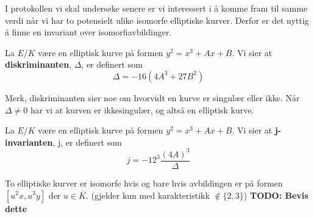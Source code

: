 
I protokollen vi skal undersøke senere er vi interessert i å komme fram til samme verdi når vi har to potensielt ulike isomorfe elliptiske kurver. Derfor er det nyttig å finne en invariant over isomorfiavbildinger. 

\begin{definisjon}
La $E/K$ være en elliptisk kurve på formen $y^2 = x^3 + Ax + B$. Vi sier at \textbf{diskriminanten}, $\Delta$, er definert som $$ \Delta = -16(4A^3 + 27B^2) $$
\end{definisjon}
Merk, diskriminanten sier noe om hvorvidt en kurve er singulær eller ikke. Når $\Delta \neq 0$ har vi at kurven er ikkesingulær, og altså en elliptisk kurve.

\begin{definisjon}
La $E/K$ være en elliptisk kurve på formen $y^2 = x^3 + Ax + B$. Vi sier at \textbf{j-invarianten}, j, er definert som $$ j = -12^3 \frac{(4A)^3}{\Delta} $$
\end{definisjon}

\begin{proposisjon}
To elliptiske kurver er isomorfe hvis og bare hvis avbildingen er på formen $[u^2x, u^3y]$ der $u \in \overline{K}$. (gjelder kun med karakteristikk $\notin \{2,3 \}$) \textbf{TODO: Bevis dette}
\end{proposisjon}


